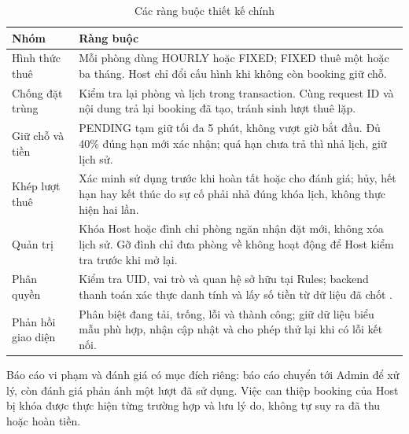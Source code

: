 \begin{table}[H]\centering\small
\caption{Các ràng buộc thiết kế chính}\label{tab:ch2-constraints}
\begin{tabularx}{\linewidth}{@{}p{3.2cm}X@{}}\toprule
Nhóm & Ràng buộc\\\midrule
Hình thức thuê & Mỗi phòng dùng HOURLY hoặc FIXED; FIXED thuê một hoặc ba tháng. Host chỉ đổi cấu hình khi không còn booking giữ chỗ.\\
Chống đặt trùng & Kiểm tra lại phòng và lịch trong transaction. Cùng request ID và nội dung trả lại booking đã tạo, tránh sinh lượt thuê lặp.\\
Giữ chỗ và tiền & PENDING tạm giữ tối đa 5 phút, không vượt giờ bắt đầu. Đủ 40\% đúng hạn mới xác nhận; quá hạn chưa trả thì nhả lịch, giữ lịch sử.\\
Khép lượt thuê & Xác minh sử dụng trước khi hoàn tất hoặc cho đánh giá; hủy, hết hạn hay kết thúc do sự cố phải nhả đúng khóa lịch, không thực hiện hai lần.\\
Quản trị & Khóa Host hoặc đình chỉ phòng ngăn nhận đặt mới, không xóa lịch sử. Gỡ đình chỉ đưa phòng về không hoạt động để Host kiểm tra trước khi mở lại.\\
Phân quyền & Kiểm tra UID, vai trò và quan hệ sở hữu tại Rules; backend thanh toán xác thực danh tính và lấy số tiền từ dữ liệu đã chốt \parencite{firebase_rules_conditions}.\\
Phản hồi giao diện & Phân biệt đang tải, trống, lỗi và thành công; giữ dữ liệu biểu mẫu phù hợp, nhận cập nhật và cho phép thử lại khi có lỗi kết nối.\\
\bottomrule\end{tabularx}
\end{table}

Báo cáo vi phạm và đánh giá có mục đích riêng: báo cáo chuyển tới Admin để xử lý, còn đánh giá phản ánh một lượt đã sử dụng. Việc can thiệp booking của Host bị khóa được thực hiện từng trường hợp và lưu lý do, không tự suy ra đã thu hoặc hoàn tiền.

